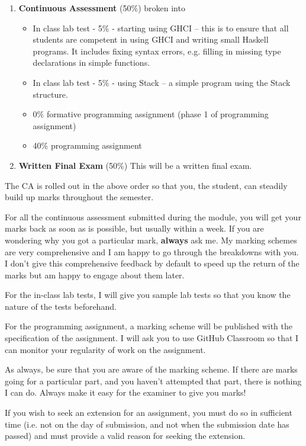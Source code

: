 \documentclass{article}
\begin{document}
\begin{enumerate}

    \item  \textbf{Continuous Assessment} (50\%) broken into 
    \begin{itemize}
        \item In class lab test - 5\% - starting using GHCI – this is to ensure that all students are competent in using GHCI and writing small Haskell programs. It includes fixing syntax errors, e.g. filling in missing type declarations in simple functions.
        \item In class lab test - 5\% - using Stack – a simple program using the Stack structure.
        \item  0\% formative programming assignment (phase 1 of programming assignment)
        \item  40\% programming assignment 
    \end{itemize}
    \item \textbf{Written Final Exam} (50\%) This will be a written final exam. 
\end{enumerate}



The CA is rolled out in the above order so that you, the student, can steadily build up marks throughout the semester. 

For all the continuous assessment submitted during the module, you will get your marks back as soon as is possible, but usually within a week. 
If you are wondering why you got a particular mark, \textbf{always} ask me. My marking schemes are very comprehensive and I am happy to go through the breakdowns with you. 
I don't give this comprehensive feedback by default to speed up the return of the marks but am happy to engage about them later. 

For the in-class lab tests, I will give you sample lab tests so that you know the nature of the tests beforehand. 

For the programming assignment, a marking scheme will be published with the specification of the assignment. I will ask you to use GitHub Classroom so that I can monitor your regularity of work on the assignment.

As always, be sure that you are aware of the marking scheme. 
If there are marks going for a particular part, and you haven't attempted that part, there is nothing I can do. Always make it easy for the examiner to give you marks!

If you wish to seek an extension for an assignment, you must do so in sufficient time (i.e. not on the day of submission, and not 
when the submission date has passed) and must provide a valid reason for seeking the extension. 
\end{document}
